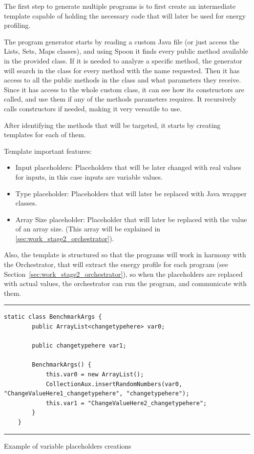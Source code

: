 The first step to generate multiple programs is to first create an intermediate template capable of holding the necessary code that will later be used for energy profiling.

The program generator starts by reading a custom Java file (or just access the Lists, Sets, Maps classes), and using Spoon it finds every public method available in the provided class. If it is needed to analyze a specific method, the generator will search in the class for every method with the name requested. Then it has access to all the public methods in the class and what parameters they receive.
Since it has access to the whole custom class, it can see how its constructors are called, and use them if any of the methods parameters requires. It recursively calls constructors if needed, making it very versatile to use. 

After identifying the methods that will be targeted, it starts by creating templates for each of them. 

Template important features:

\begin{itemize}

  \item Input placeholders: Placeholders that will be later changed with real values for inputs, in this case inputs are variable values. 

  \item Type placeholder: Placeholders that will later be replaced with Java wrapper classes.
  
  \item Array Size placeholder: Placeholder that will later be replaced with the value of an array size. (This array will be explained in \ref{sec:work_stage2_orchestrator}). 

\end{itemize}

Also, the template is structured so that the programs will work in harmony with the Orchestrator, that will extract the energy profile for each program (see Section~\ref{sec:work_stage2_orchestrator}), so when the placeholders are replaced with actual values, the orchestrator can run the program, and communicate with them.


\begin{listing}[H]
\noindent\rule{\linewidth}{0.4pt}
\begin{verbatim}
static class BenchmarkArgs {
        public ArrayList<changetypehere> var0;

        public changetypehere var1;

        BenchmarkArgs() {
            this.var0 = new ArrayList();
            CollectionAux.insertRandomNumbers(var0, "ChangeValueHere1_changetypehere", "changetypehere");
            this.var1 = "ChangeValueHere2_changetypehere";
        }
    }
\end{verbatim}
\noindent\rule{\linewidth}{0.4pt}
\caption{Example of variable placeholders creations}            
\label{lst:var_placeholders}
\end{listing}

